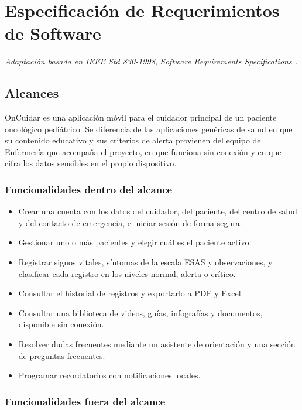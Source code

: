 \chapter[Especificación de Requerimientos de Software]{Especificación de Requerimientos de Software}

\emph{Adaptación basada en IEEE Std 830-1998, Software Requirements
Specifications \citep{ieee_830_1998}.}

\section[Alcances]{Alcances}

OnCuidar es una aplicación móvil para el cuidador principal de un paciente
oncológico pediátrico. Se diferencia de las aplicaciones genéricas de salud en
que su contenido educativo y sus criterios de alerta provienen del equipo de
Enfermería que acompaña el proyecto, en que funciona sin conexión y en que cifra
los datos sensibles en el propio dispositivo.

\subsection*{Funcionalidades dentro del alcance}

\begin{itemize}
    \item Crear una cuenta con los datos del cuidador, del paciente, del centro
    de salud y del contacto de emergencia, e iniciar sesión de forma segura.
    \item Gestionar uno o más pacientes y elegir cuál es el paciente activo.
    \item Registrar signos vitales, síntomas de la escala ESAS y observaciones,
    y clasificar cada registro en los niveles normal, alerta o crítico.
    \item Consultar el historial de registros y exportarlo a PDF y Excel.
    \item Consultar una biblioteca de videos, guías, infografías y documentos,
    disponible sin conexión.
    \item Resolver dudas frecuentes mediante un asistente de orientación y una
    sección de preguntas frecuentes.
    \item Programar recordatorios con notificaciones locales.
\end{itemize}

\subsection*{Funcionalidades fuera del alcance}

